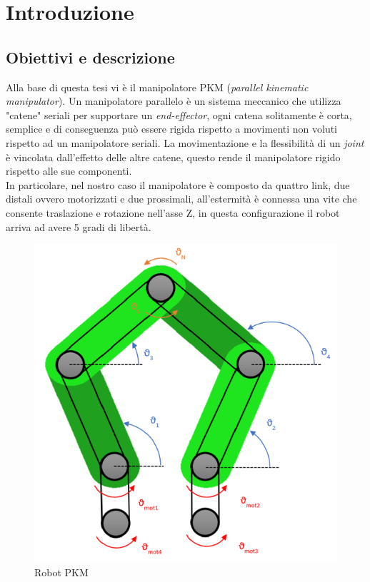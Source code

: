 \section{Introduzione}
\subsection{Obiettivi e descrizione}
Alla base di questa tesi vi è il manipolatore PKM (\textit{parallel kinematic manipulator}). Un manipolatore parallelo è un sistema meccanico che utilizza "catene" seriali per supportare un \textit{end-effector}, ogni catena solitamente è corta, semplice e di conseguenza può essere rigida rispetto a movimenti non voluti rispetto ad un manipolatore seriali. La movimentazione e la flessibilità di un \textit{joint} è vincolata dall'effetto delle altre catene, questo rende il manipolatore rigido rispetto alle sue componenti. 
\\In particolare, nel nostro caso il manipolatore è composto da quattro link, due distali ovvero motorizzati e due prossimali, all'estermità è connessa una vite che consente traslazione e rotazione nell'asse Z, in questa configurazione il robot arriva ad avere 5 gradi di libertà.
\begin{figure}[ht]
	\begin{center}
		\includegraphics[scale=0.7]{Immagini/Robot1.png}
		\caption{Robot PKM}
	\end{center}
\end{figure}
